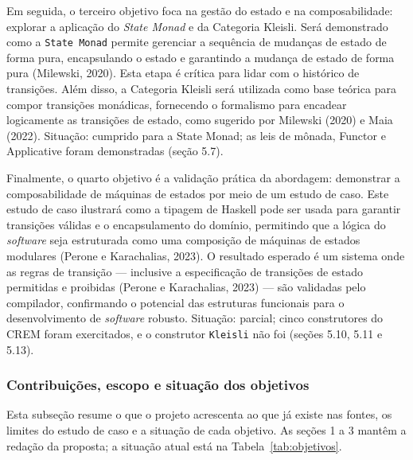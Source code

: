 \documentclass[12pt,a4paper]{article}
\begin{document}
Em seguida, o terceiro objetivo foca na gestão do estado e na composabilidade: explorar a aplicação do \textit{State Monad} e da Categoria Kleisli. Será demonstrado como a \texttt{State Monad} permite gerenciar a sequência de mudanças de estado de forma pura, encapsulando o estado e garantindo a mudança de estado de forma pura (Milewski, 2020). Esta etapa é crítica para lidar com o histórico de transições. Além disso, a Categoria Kleisli será utilizada como base teórica para compor transições monádicas, fornecendo o formalismo para encadear logicamente as transições de estado, como sugerido por Milewski (2020) e Maia (2022). Situação: cumprido para a State Monad; as leis de mônada, Functor e Applicative foram demonstradas (seção 5.7).

Finalmente, o quarto objetivo é a validação prática da abordagem: demonstrar a composabilidade de máquinas de estados por meio de um estudo de caso. Este estudo de caso ilustrará como a tipagem de Haskell pode ser usada para garantir transições válidas e o encapsulamento do domínio, permitindo que a lógica do \textit{software} seja estruturada como uma composição de máquinas de estados modulares (Perone e Karachalias, 2023). O resultado esperado é um sistema onde as regras de transição --- inclusive a especificação de transições de estado permitidas e proibidas (Perone e Karachalias, 2023) --- são validadas pelo compilador, confirmando o potencial das estruturas funcionais para o desenvolvimento de \textit{software} robusto. Situação: parcial; cinco construtores do CREM foram exercitados, e o construtor \texttt{Kleisli} não foi (seções 5.10, 5.11 e 5.13).


\subsubsection{Contribuições, escopo e situação dos objetivos}
\label{sec:contrib}

Esta subseção resume o que o projeto acrescenta ao que já existe nas fontes, os limites do estudo de caso e a situação de cada objetivo. As seções 1 a 3 mantêm a redação da proposta; a situação atual está na Tabela~\ref{tab:objetivos}.
\end{document}
